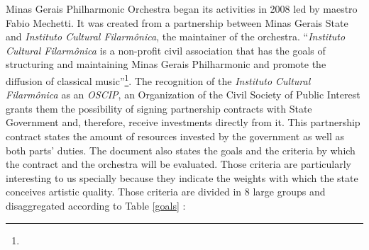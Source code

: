 \documentclass[a4paper, 12pt, openright, oneside, german, french, brazil, english]{abntex2}
\begin{document}
        Minas Gerais Philharmonic Orchestra began its activities in 2008 led by maestro Fabio Mechetti. It was created from a partnership between Minas Gerais State and \textit{Instituto Cultural Filarmônica}, the maintainer of the orchestra. ``\textit{Instituto Cultural Filarmônica} is a non-profit civil association that has the goals of structuring and maintaining Minas Gerais Philharmonic and promote the diffusion of classical music''\footnote{}.
        The recognition of the \textit{Instituto Cultural Filarmônica} as an \textit{OSCIP}, an Organization of the Civil Society of Public Interest grants them the possibility of signing partnership contracts \cite{minas2017aditivo} with State Government and, therefore, receive investments directly from it. This partnership contract states the amount of resources invested by the government as well as both parts' duties. The document also states the goals and the criteria by which the contract and the orchestra will be evaluated. Those criteria are particularly interesting to us specially because they indicate the weights with which the state conceives artistic quality. Those criteria are divided in 8 large groups and disaggregated according to Table \ref{goals} \cite{filarmonica2017gerencial}:
\end{document}
